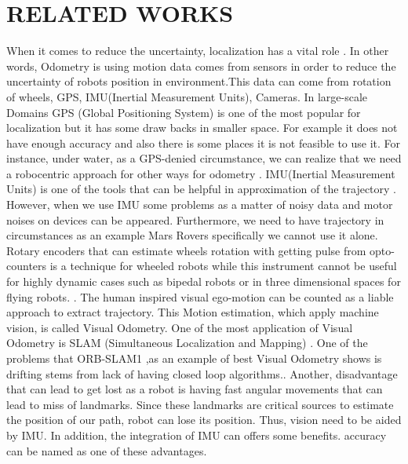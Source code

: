\documentclass[a4paper,twoside]{article}
\begin{document}
\section{\uppercase{Related Works}}
When it comes to reduce the uncertainty, localization has a vital role \cite{cadena2016past}. 
In other words, Odometry is using motion data comes from sensors in order to reduce the uncertainty of robots position in environment\cite{huang2017visual,valencia2018mapping}.This data can come from rotation of wheels, GPS, IMU(Inertial Measurement Units), Cameras.
In large-scale Domains GPS (Global Positioning System) is one of the most popular for localization but it has some draw backs in smaller space. For example it does not have enough accuracy and also there is some places it is not feasible to use it. For instance, under water, as a GPS-denied circumstance, we can realize that we need a robocentric approach for other ways for odometry \cite{saska2017system}.
IMU(Inertial Measurement Units) is one of the tools that can be helpful in approximation of the trajectory \cite{gui2015mems}. However, when we use IMU some problems as a matter of noisy data and motor noises on devices can be appeared. Furthermore, we need to have trajectory in circumstances as an example Mars Rovers specifically we cannot use it alone.\cite{mars-rover-slam}  
Rotary encoders that can estimate wheels rotation with getting pulse from opto-counters is a technique for wheeled robots while this instrument cannot be useful for highly dynamic cases such as bipedal robots or in three dimensional spaces for flying robots.  \cite{rovio15}.
The human inspired visual ego-motion can be counted as a liable approach to extract trajectory\cite{engel2018direct}. This Motion estimation, which apply machine vision, is called Visual Odometry. One of the most application of Visual Odometry is SLAM (Simultaneous Localization and Mapping) \cite{orb-slam1,orb-slam2,forster2017svo,mueggler2017event}.
One of the problems that ORB-SLAM1\cite{orb-slam1} ,as an example of best Visual Odometry shows is drifting stems from lack of having closed loop algorithms.\cite{7817784}. Another, disadvantage that can lead to get lost as a robot is having fast angular movements that can lead to miss of landmarks. Since these landmarks are critical sources to estimate the position of our path, robot can lose its position. Thus, vision need to be aided by IMU. In addition, the integration of IMU can offers some benefits\cite{leutenegger2015keyframe}. accuracy can be named as one of these advantages\cite{rovio17,schneider2018maplab,sun2018robust}. 
\end{document}
